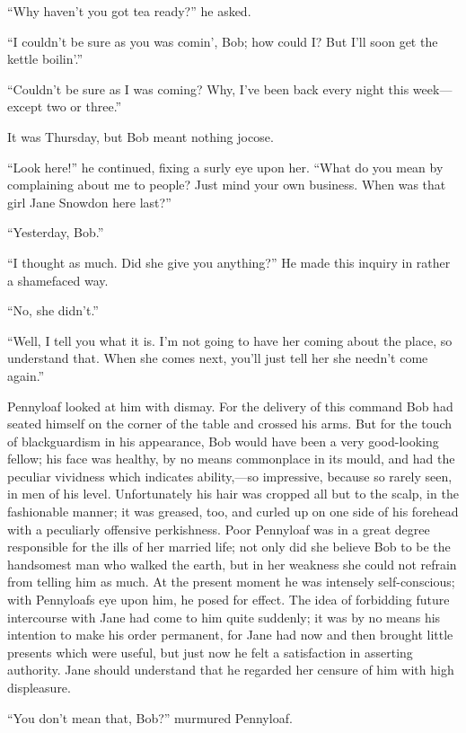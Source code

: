 ``Why haven't you got tea ready?'' he asked.

``I couldn't be sure as you was comin', Bob; how could I? But I'll soon
get the kettle boilin'.''

``Couldn't be sure as I was coming? Why, I've been back every night this
week---except two or three.''

{\protect\hypertarget{223}{}{}}It was Thursday, but Bob meant nothing
jocose.

``Look here!'' he continued, fixing a surly eye upon her. ``What do you
mean by complaining about me to people? Just mind your own business.
When was that girl Jane Snowdon here last?''

``Yesterday, Bob.''

``I thought as much. Did she give you anything?'' He made this inquiry
in rather a shamefaced way.

``No, she didn't.''

``Well, I tell you what it is. I'm not going to have her coming about
the place, so understand that. When she comes next, you'll just tell her
she needn't come again.''

Pennyloaf looked at him with dismay. For the delivery of this command
Bob had seated himself on the corner of the table and crossed his arms.
But for the touch of blackguardism in his appearance, Bob would have
been a very good-looking fellow; his face was healthy, by no means
commonplace in its mould, and had the peculiar vividness which
{\protect\hypertarget{224}{}{}}indicates ability,---so impressive,
because so rarely seen, in men of his level. Unfortunately his hair was
cropped all but to the scalp, in the fashionable manner; it was greased,
too, and curled up on one side of his forehead with a peculiarly
offensive perkishness. Poor Pennyloaf was in a great degree responsible
for the ills of her married life; not only did she believe Bob to be the
handsomest man who walked the earth, but in her weakness she could not
refrain from telling him as much. At the present moment he was intensely
self-conscious; with Pennyloafs eye upon him, he posed for effect. The
idea of forbidding future intercourse with Jane had come to him quite
suddenly; it was by no means his intention to make his order permanent,
for Jane had now and then brought little presents which were useful, but
just now he felt a satisfaction in asserting authority. Jane should
understand that he regarded her censure of him with high displeasure.

``You don't mean that, Bob?'' murmured Pennyloaf.

